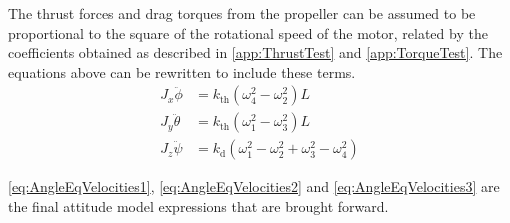 The thrust forces and drag torques from the propeller can be assumed to be proportional to the square of the rotational speed of the motor, related by the coefficients obtained as described in \autoref{app:ThrustTest} and \ref{app:TorqueTest}. The equations above can be rewritten to include these terms.
%
\begin{align}
J_x \ddot{\phi}&=k_\mathrm{th} (\omega^2_4-\omega^2_2)  L \label{eq:AngleEqVelocities1}\\
J_y \ddot{\theta}&=k_\mathrm{th} (\omega^2_1-\omega^2_3)  L \label{eq:AngleEqVelocities2} \\
J_z \ddot{\psi}&=k_\mathrm{d} (\omega^2_1-\omega^2_2+\omega^2_3-\omega^2_4)
\label{eq:AngleEqVelocities3}
\end{align}
\begin{where}
\end{where}

\autoref{eq:AngleEqVelocities1}, \ref{eq:AngleEqVelocities2} 
and \ref{eq:AngleEqVelocities3} are the final attitude model expressions that are brought forward. %